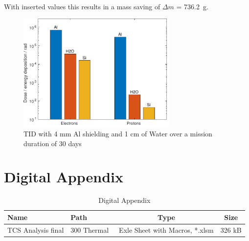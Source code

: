 With inserted values this results in a mass saving of \(\Delta m\) = 736.2~g.

\begin{figure}[htp]
	\centering
	\includegraphics[width=0.7\textwidth]{Media/J_Improvements_Ice}
	\caption{TID with 4 mm Al shielding and 1 cm of Water over a mission duration of 30 days}
	\label{fig:Radiation_Improvements_Ice}
\end{figure}

\clearpage

\setcounter{figure}{0}
\setcounter{table}{0}

\section{Digital Appendix}		\label{app:DigitalAppendix}

\begin{table}[htb]
	\centering
	\begin{tabular}{llcc}
	\toprule
		Name  & Path & Type & Size  \\
	\midrule
		TCS Analysis final & 300 Thermal\ & Exle Sheet with Macros, *.xlsm & 326 kB  \\
	\bottomrule
	\end{tabular}
	\caption{Digital Appendix}
	\label{app:DigitalAppendix}
\end{table}

\cleardoublepage